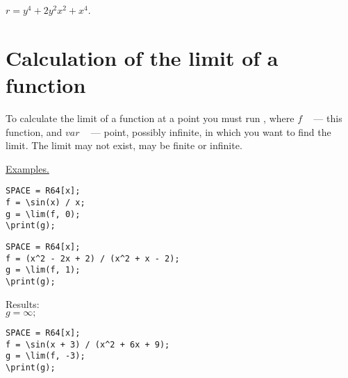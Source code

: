 {$r=y^{4}+2y^{2}x^{2}+x^{4}$.}

\section{Calculation of the limit of a function}

To calculate the limit of a function at a point you must run 
,
where $ f $ ~ --- this function, and $ var $ ~ --- point, possibly infinite, in which you want to find the limit. The limit may not exist, may be finite or infinite.

\smallskip

\underline{Examples. }

\vspace*{-3mm}
\begin{verbatim}
SPACE = R64[x];
f = \sin(x) / x;
g = \lim(f, 0);
\print(g);
\end{verbatim}
\vspace*{-3mm}


\begin{verbatim}
SPACE = R64[x];
f = (x^2 - 2x + 2) / (x^2 + x - 2);
g = \lim(f, 1);
\print(g);
\end{verbatim}
\vspace*{-3mm}

Results:\\
{$g = \infty;$}

\begin{verbatim}
SPACE = R64[x];
f = \sin(x + 3) / (x^2 + 6x + 9);
g = \lim(f, -3);
\print(g);
\end{verbatim}
\vspace*{-3mm}

